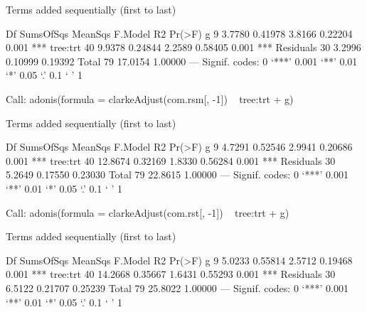 \documentclass[12pt]{article}
\begin{document}
\begin{Schunk}
\begin{Soutput}
Terms added sequentially (first to last)

          Df SumsOfSqs MeanSqs F.Model      R2 Pr(>F)    
g          9    3.7780 0.41978  3.8166 0.22204  0.001 ***
tree:trt  40    9.9378 0.24844  2.2589 0.58405  0.001 ***
Residuals 30    3.2996 0.10999         0.19392           
Total     79   17.0154                 1.00000           
---
Signif. codes:  0 ‘***’ 0.001 ‘**’ 0.01 ‘*’ 0.05 ‘.’ 0.1 ‘ ’ 1 
\end{Soutput}
\begin{Soutput}
Call:
adonis(formula = clarkeAdjust(com.rsm[, -1]) ~ tree:trt + g) 

Terms added sequentially (first to last)

          Df SumsOfSqs MeanSqs F.Model      R2 Pr(>F)    
g          9    4.7291 0.52546  2.9941 0.20686  0.001 ***
tree:trt  40   12.8674 0.32169  1.8330 0.56284  0.001 ***
Residuals 30    5.2649 0.17550         0.23030           
Total     79   22.8615                 1.00000           
---
Signif. codes:  0 ‘***’ 0.001 ‘**’ 0.01 ‘*’ 0.05 ‘.’ 0.1 ‘ ’ 1 
\end{Soutput}
\begin{Soutput}
Call:
adonis(formula = clarkeAdjust(com.rst[, -1]) ~ tree:trt + g) 

Terms added sequentially (first to last)

          Df SumsOfSqs MeanSqs F.Model      R2 Pr(>F)    
g          9    5.0233 0.55814  2.5712 0.19468  0.001 ***
tree:trt  40   14.2668 0.35667  1.6431 0.55293  0.001 ***
Residuals 30    6.5122 0.21707         0.25239           
Total     79   25.8022                 1.00000           
---
Signif. codes:  0 ‘***’ 0.001 ‘**’ 0.01 ‘*’ 0.05 ‘.’ 0.1 ‘ ’ 1 
\end{Soutput}
\end{Schunk}
\end{document}
